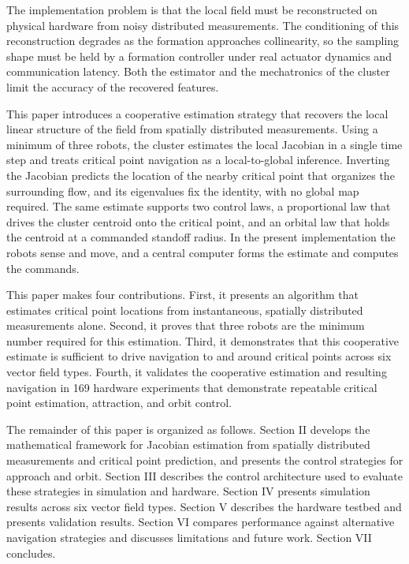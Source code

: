 \documentclass[lettersize,journal]{IEEEtran}
\begin{document}
The implementation problem is that the local field must be reconstructed on physical hardware from noisy distributed measurements. The conditioning of this reconstruction degrades as the formation approaches collinearity, so the sampling shape must be held by a formation controller under real actuator dynamics and communication latency. Both the estimator and the mechatronics of the cluster limit the accuracy of the recovered features.

This paper introduces a cooperative estimation strategy that recovers the local linear structure of the field from spatially distributed measurements. Using a minimum of three robots, the cluster estimates the local Jacobian in a single time step and treats critical point navigation as a local-to-global inference. Inverting the Jacobian predicts the location of the nearby critical point that organizes the surrounding flow, and its eigenvalues fix the identity, with no global map required. The same estimate supports two control laws, a proportional law that drives the cluster centroid onto the critical point, and an orbital law that holds the centroid at a commanded standoff radius. In the present implementation the robots sense and move, and a central computer forms the estimate and computes the commands.

This paper makes four contributions. First, it presents an algorithm that estimates critical point locations from instantaneous, spatially distributed measurements alone. Second, it proves that three robots are the minimum number required for this estimation. Third, it demonstrates that this cooperative estimate is sufficient to drive navigation to and around critical points across six vector field types. Fourth, it validates the cooperative estimation and resulting navigation in 169 hardware experiments that demonstrate repeatable critical point estimation, attraction, and orbit control.

The remainder of this paper is organized as follows. Section II develops the mathematical framework for Jacobian estimation from spatially distributed measurements and critical point prediction, and presents the control strategies for approach and orbit. Section III describes the control architecture used to evaluate these strategies in simulation and hardware. Section IV presents simulation results across six vector field types. Section V describes the hardware testbed and presents validation results. Section VI compares performance against alternative navigation strategies and discusses limitations and future work. Section VII concludes.
\end{document}
